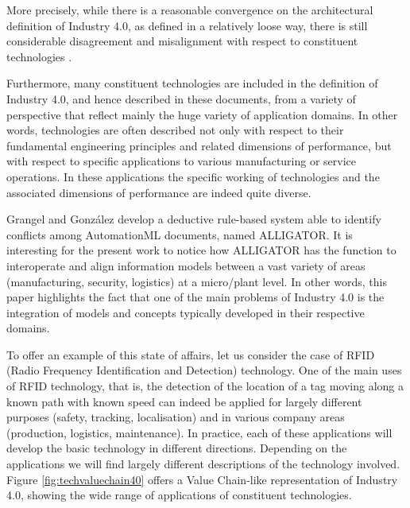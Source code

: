 \documentclass[]{book}
\begin{document}
More precisely, while there is a reasonable convergence on the
architectural definition of Industry 4.0, as defined in a relatively
loose way, there is still considerable disagreement and misalignment
with respect to constituent technologies
\citep{riel2017integrated, smit2016industry, o2015industrial}.

Furthermore, many constituent technologies are included in the
definition of Industry 4.0, and hence described in these documents, from
a variety of perspective that reflect mainly the huge variety of
application domains. In other words, technologies are often described
not only with respect to their fundamental engineering principles and
related dimensions of performance, but with respect to specific
applications to various manufacturing or service operations. In these
applications the specific working of technologies and the associated
dimensions of performance are indeed quite diverse.

Grangel and González \citep{grangel2016towards} develop a deductive
rule-based system able to identify conflicts among AutomationML
documents, named ALLIGATOR. It is interesting for the present work to
notice how ALLIGATOR has the function to interoperate and align
information models between a vast variety of areas (manufacturing,
security, logistics) at a micro/plant level. In other words, this paper
highlights the fact that one of the main problems of Industry 4.0 is the
integration of models and concepts typically developed in their
respective domains.

To offer an example of this state of affairs, let us consider the case
of RFID (Radio Frequency Identification and Detection) technology. One
of the main uses of RFID technology, that is, the detection of the
location of a tag moving along a known path with known speed can indeed
be applied for largely different purposes (safety, tracking,
localisation) and in various company areas (production, logistics,
maintenance). In practice, each of these applications will develop the
basic technology in different directions. Depending on the applications
we will find largely different descriptions of the technology involved.
Figure \ref{fig:techvaluechain40} offers a Value Chain-like
representation of Industry 4.0, showing the wide range of applications
of constituent technologies.
\end{document}
